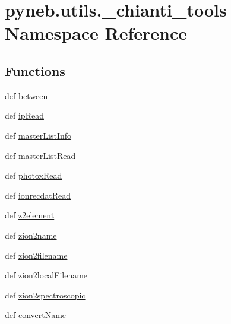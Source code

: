 \hypertarget{namespacepyneb_1_1utils_1_1__chianti__tools}{\section{pyneb.\-utils.\-\_\-chianti\-\_\-tools Namespace Reference}
\label{namespacepyneb_1_1utils_1_1__chianti__tools}
}
\subsection*{Functions}
\begin{DoxyCompactItemize}
\item 
def \hyperlink{namespacepyneb_1_1utils_1_1__chianti__tools_ae0d64630471a208f147d1dded0d49e0a}{between}
\item 
def \hyperlink{namespacepyneb_1_1utils_1_1__chianti__tools_addc139edf6069387aed0049344002b13}{ip\-Read}
\item 
def \hyperlink{namespacepyneb_1_1utils_1_1__chianti__tools_a5677fc0d50bd22a853c14b4b2606b89e}{master\-List\-Info}
\item 
def \hyperlink{namespacepyneb_1_1utils_1_1__chianti__tools_ab11f940d11d2b1118ffb581a39d7e42a}{master\-List\-Read}
\item 
def \hyperlink{namespacepyneb_1_1utils_1_1__chianti__tools_a25b33696ac2b1d2f01e5789a70a234ec}{photox\-Read}
\item 
def \hyperlink{namespacepyneb_1_1utils_1_1__chianti__tools_a12d45bcebd107c5fd133830132e8cd5e}{ionrecdat\-Read}
\item 
def \hyperlink{namespacepyneb_1_1utils_1_1__chianti__tools_a384f39b118999003fd2d0c54974a0aff}{z2element}
\item 
def \hyperlink{namespacepyneb_1_1utils_1_1__chianti__tools_a7d6debb5f68b52f64c311ca1fe99945c}{zion2name}
\item 
def \hyperlink{namespacepyneb_1_1utils_1_1__chianti__tools_a46370e972711f8737755fa9c8fb57ed8}{zion2filename}
\item 
def \hyperlink{namespacepyneb_1_1utils_1_1__chianti__tools_aa1c272dcccda8670d22cf866cd0e9b5f}{zion2local\-Filename}
\item 
def \hyperlink{namespacepyneb_1_1utils_1_1__chianti__tools_a4c5a7ace6a222c4cfad8f00cf2b68554}{zion2spectroscopic}
\item 
def \hyperlink{namespacepyneb_1_1utils_1_1__chianti__tools_a8038874902563556b0a8b536f52d3194}{convert\-Name}
\item 

\end{DoxyCompactItemize}

